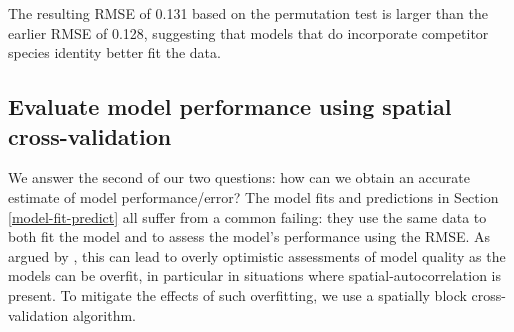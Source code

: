 \documentclass[12pt]{article}
\newenvironment{Shaded}{\begin{snugshade}}{\end{snugshade}}
\newcommand{\CommentTok}[1]{\textcolor[rgb]{0.56,0.35,0.01}{\textit{#1}}}
\newcommand{\DataTypeTok}[1]{\textcolor[rgb]{0.13,0.29,0.53}{#1}}
\newcommand{\KeywordTok}[1]{\textcolor[rgb]{0.13,0.29,0.53}{\textbf{#1}}}
\newcommand{\NormalTok}[1]{#1}
\newcommand{\OperatorTok}[1]{\textcolor[rgb]{0.81,0.36,0.00}{\textbf{#1}}}
\newcommand{\OtherTok}[1]{\textcolor[rgb]{0.56,0.35,0.01}{#1}}
\newcommand{\StringTok}[1]{\textcolor[rgb]{0.31,0.60,0.02}{#1}}
\begin{document}
\begin{Shaded}
\end{Shaded}

\begin{Shaded}
\end{Shaded}

The resulting RMSE of 0.131 based on the permutation test is larger than
the earlier RMSE of 0.128, suggesting that models that do incorporate
competitor species identity better fit the data.

\hypertarget{spatial-cross-validation}{%
\subsection{Evaluate model performance using spatial
cross-validation}\label{spatial-cross-validation}}

We answer the second of our two questions: how can we obtain an accurate
estimate of model performance/error? The model fits and predictions in
Section \ref{model-fit-predict} all suffer from a common failing: they
use the same data to both fit the model and to assess the model's
performance using the RMSE. As argued by
\citet{roberts_cross-validation_2017}, this can lead to overly
optimistic assessments of model quality as the models can be overfit, in
particular in situations where spatial-autocorrelation is present. To
mitigate the effects of such overfitting, we use a spatially block
cross-validation algorithm.
\end{document}
